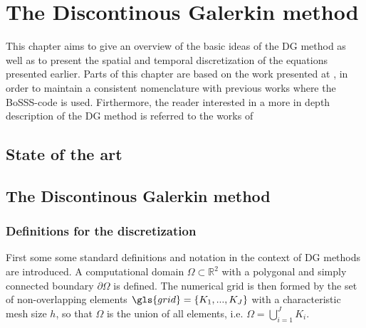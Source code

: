 \chapter{The Discontinous Galerkin method}	\label{ch:NumericalMethods}
This chapter aims to give an overview of the basic ideas of the DG method as well as to present the spatial and temporal discretization of the equations presented earlier. Parts of this chapter are based on the work presented at \parencite{kummerExtendedDiscontinuousGalerkin2017,kikkerFullyCoupledHighorder, smudamartinDirectNumericalSimulation2021}, in order to maintain a consistent nomenclature with previous works where the BoSSS-code is used. Firthermore, the reader interested in a more in depth description of the DG method is referred to the works of  \parencite{cockburnDevelopmentDiscontinuousGalerkin2000,hesthavenNodalDiscontinuousGalerkin2008,dipietroMathematicalAspectsDiscontinuous2012}

\section{State of the art}

\section{The Discontinous Galerkin method}

\subsection{Definitions for the discretization} \label{ssec:SpatDiscretization}
First some some standard definitions and notation in the context of DG methods are introduced. 
A computational domain $\Omega \subset \mathbb{R}^2$ with a polygonal and simply connected boundary $\partial \Omega$ is defined. The numerical grid is then formed by the set of non-overlapping elements $\gls{grid} = \{K_1, ..., K_J\}$ with a characteristic mesh size $h$, so that $\Omega$ is the union of all elements, i.e. $\Omega = \bigcup_{i=1}^J K_i$. 

